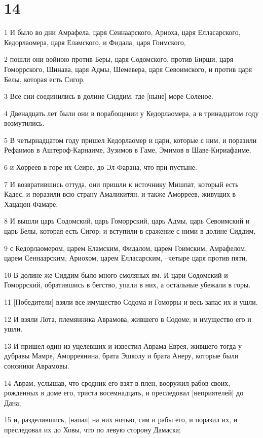 \chapter{14}

\par 1 И было во дни Амрафела, царя Сеннаарского, Ариоха, царя Елласарского, Кедорлаомера, царя Еламского, и Фидала, царя Гоимского,
\par 2 пошли они войною против Беры, царя Содомского, против Бирши, царя Гоморрского, Шинава, царя Адмы, Шемевера, царя Севоимского, и против царя Белы, которая есть Сигор.
\par 3 Все сии соединились в долине Сиддим, где [ныне] море Соленое.
\par 4 Двенадцать лет были они в порабощении у Кедорлаомера, а в тринадцатом году возмутились.
\par 5 В четырнадцатом году пришел Кедорлаомер и цари, которые с ним, и поразили Рефаимов в Аштероф-Карнаиме, Зузимов в Гаме, Эмимов в Шаве-Кириафаиме,
\par 6 и Хорреев в горе их Сеире, до Эл-Фарана, что при пустыне.
\par 7 И возвратившись оттуда, они пришли к источнику Мишпат, который есть Кадес, и поразили всю страну Амаликитян, и также Аморреев, живущих в Хацацон-Фамаре.
\par 8 И вышли царь Содомский, царь Гоморрский, царь Адмы, царь Севоимский и царь Белы, которая есть Сигор; и вступили в сражение с ними в долине Сиддим,
\par 9 с Кедорлаомером, царем Еламским, Фидалом, царем Гоимским, Амрафелом, царем Сеннаарским, Ариохом, царем Елласарским, --четыре царя против пяти.
\par 10 В долине же Сиддим было много смоляных ям. И цари Содомский и Гоморрский, обратившись в бегство, упали в них, а остальные убежали в горы.
\par 11 [Победители] взяли все имущество Содома и Гоморры и весь запас их и ушли.
\par 12 И взяли Лота, племянника Аврамова, жившего в Содоме, и имущество его и ушли.
\par 13 И пришел один из уцелевших и известил Аврама Еврея, жившего тогда у дубравы Мамре, Аморреянина, брата Эшколу и брата Анеру, которые были союзники Аврамовы.
\par 14 Аврам, услышав, что сродник его взят в плен, вооружил рабов своих, рожденных в доме его, триста восемнадцать, и преследовал [неприятелей] до Дана;
\par 15 и, разделившись, [напал] на них ночью, сам и рабы его, и поразил их, и преследовал их до Ховы, что по левую сторону Дамаска;
